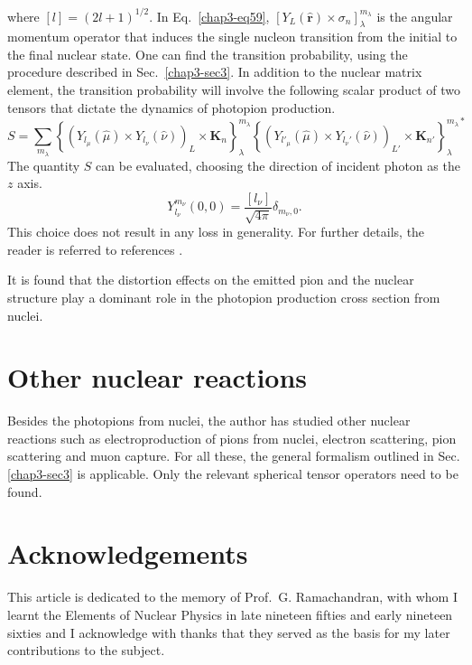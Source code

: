 where $[l] = (2l+1)^{1/2}$. In Eq.\ \eqref{chap3-eq59}, $[Y_L ({\boldsymbol \hat{r}}) \times \sigma_n]_\lambda^{m_\lambda}$ is the angular momentum operator that induces the single nucleon transition from the initial to the final nuclear state. One can find the transition probability, using the procedure described in Sec.\ \ref{chap3-sec3}. In addition to the nuclear matrix element, the transition probability will involve the following scalar product of two tensors that dictate the dynamics of photopion production.
\begin{equation}
  S= \sum_{m_\lambda} \left\{ (Y_{l_\mu} (\hat{\mu}) \times Y_{l_\nu} (\hat{\nu}))_L \times {\boldsymbol K}_n\right\}_\lambda^{m_\lambda} \left\{(Y_{l'_\mu} (\hat{\mu}) \times Y_{l_\nu'}(\hat{\nu}))_{L'} \times {\boldsymbol K}_{n'} \right\}_{\lambda}^{m_\lambda\ast} \label{chap3-eq60}
\end{equation}
The quantity $S$ can be evaluated, choosing the direction of incident photon as the $z$ axis.
$$
Y_{l_\nu}^{m_\nu} (0, 0) = \frac{[l_\nu]}{\sqrt{4\pi}}\delta_{m_\nu, 0}.
$$
This choice does not result in any loss in generality. For further details, the reader is referred to references \cite{chap3-key20, chap3-key21}.

It is found that the distortion effects on the emitted pion and the nuclear structure play a dominant role \cite{chap3-key21} in the photopion production cross section from nuclei.

\section{Other nuclear reactions}\label{chap3-sec6}

Besides the photopions from nuclei, the author has studied other nuclear reactions such as electroproduction of pions from nuclei, electron scattering, pion scattering and muon capture. For all these, the general formalism outlined in Sec.\ref{chap3-sec3} is applicable. Only the relevant spherical tensor operators need to be found.
\bigskip

\section*{Acknowledgements}

This article is dedicated to the memory of Prof.\ G. Ramachandran, with whom I learnt the Elements of Nuclear Physics in late nineteen fifties and early nineteen sixties and I acknowledge with thanks that they served as the basis for my later contributions to the subject.


